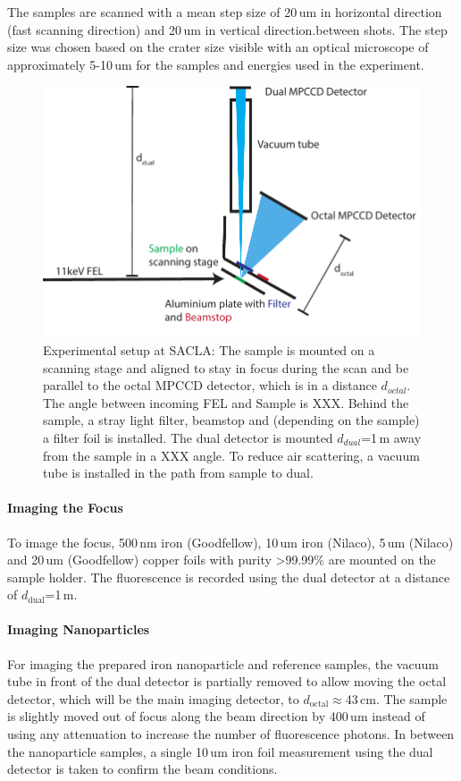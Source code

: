 The samples are scanned with a mean step size of 20\,um in horizontal direction (fast scanning direction) and 20\,um in vertical direction.between shots. The step size was chosen based on the crater size visible with an optical microscope of approximately 5-10\,um for the samples and energies used in the experiment.

\begin{figure}
	\centering
	\includegraphics[width=0.75\linewidth]{images/setup.pdf}
	\caption[Experimental setup at SACLA]{Experimental setup at SACLA: The sample is mounted on a scanning stage and aligned to stay in focus during the scan and be parallel to the octal MPCCD detector, which is in a distance $d_{octal}$. The angle between incoming FEL and Sample is XXX. Behind the sample, a stray light filter, beamstop and (depending on the sample) a filter foil is installed. The dual detector is mounted $d_{dual}$=1\,m away from the sample in a XXX angle. To reduce air scattering, a vacuum tube is installed in the path from sample to dual.}
	\label{fig:setup}
\end{figure}
\paragraph{Imaging the Focus}
To image the focus, 500\,nm iron (Goodfellow), 10\,um iron (Nilaco), 5\,um (Nilaco) and 20\,um (Goodfellow) copper foils with purity >99.99\% are mounted on the sample holder. The fluorescence is recorded using the dual detector at a distance of $d_\text{dual}$=1\,m.
\paragraph{Imaging Nanoparticles}
For imaging the prepared iron nanoparticle and reference samples, the vacuum tube in front of the dual detector is partially removed to allow moving the octal detector, which will be the main imaging detector, to $d_\text{octal}\approx$43\,cm. The sample is slightly moved out of focus along the beam direction by 400\,um instead of using any attenuation to increase the number of fluorescence photons. In between the nanoparticle samples, a single 10\,um iron foil measurement using the dual detector is taken to confirm the beam conditions.

